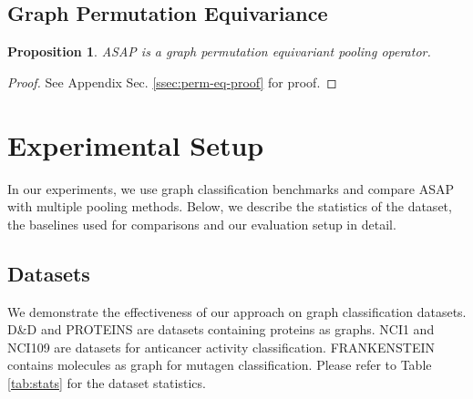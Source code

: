 \documentclass[letterpaper]{article} \usepackage{aaai20}  \usepackage{times}  \usepackage{helvet} \usepackage{courier}  \usepackage[hyphens]{url}  \usepackage{graphicx} \urlstyle{rm} \def\UrlFont{\rm}  \usepackage{graphicx}  \frenchspacing  \setlength{\pdfpagewidth}{8.5in}  \setlength{\pdfpageheight}{11in}
\newtheorem{proposition}{Proposition}
\begin{document}
 
\subsection{Graph Permutation Equivariance}

\begin{proposition}
ASAP is a graph permutation equivariant pooling operator. 
\end{proposition}
\begin{proof}
See Appendix Sec. \ref{ssec:perm-eq-proof} for proof.
\end{proof}


 
\section{Experimental Setup}
In our experiments, we use  graph classification benchmarks and compare ASAP with multiple pooling methods. Below, we describe the statistics of the dataset, the baselines used for comparisons and our evaluation setup in detail.

\subsection{Datasets}
We demonstrate the effectiveness of our approach on  graph classification datasets. D\&D \cite{dd1,dd2-proteins} and PROTEINS \cite{dd2-proteins,proteins} are datasets containing proteins as graphs. NCI1 \cite{nci1} and NCI109 are datasets for anticancer activity classification. FRANKENSTEIN \cite{frankenstein} contains molecules as graph for mutagen classification. Please refer to Table \ref{tab:stats} for the dataset statistics.

\begin{table}[!tbh]
	\centering
	\caption{\label{tab:stats} Statistics of the graph datasets. , ,  and  denotes the average number of graphs, classes, nodes and edges respectively.}
\end{table}
\end{document}
